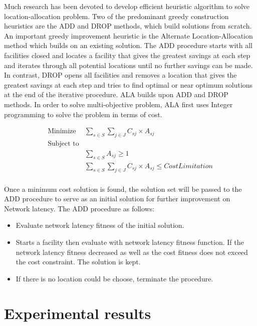 \documentclass{llncs}
\begin{document}
Much research has been devoted to develop efficient heuristic algorithm to solve location-allocation problem. Two of the predominant
greedy construction heuristics are the ADD and DROP \cite{Sun} methods, which build solutions from scratch. 
An important greedy improvement heuristic is the Alternate Location-Allocation method which builds on an existing solution. 
The ADD procedure starts with all facilities closed and locates a facility that gives the greatest savings at each step and 
iterates through all potential locations until no further savings can be made. In contrast, DROP opens all facilities and removes a 
location that gives the greatest savings at each step and tries to find optimal or near optimum solutions at the end of the 
iterative procedure. ALA builds upon ADD and DROP methods. In order to solve multi-objective problem, ALA first uses Integer programming
to solve the problem in terms of cost.
		

\begin{equation}
     \begin{align}
       \mbox{Minimize } & \sum\limits_{s \in S} \sum\limits_{j \in J} C_{sj} \times A_{sj} \\
       \mbox{Subject to} & \\
	        & \sum\limits_{s \in S} A_{sj} \geq 1 \\
	        & \sum\limits_{s \in S} \sum\limits_{j \in J} C_{sj} \times A_{sj} \leq CostLimitation \\
     \end{align}
\end{equation}

Once a minimum cost solution is found, the solution set will be passed to the ADD procedure to serve as an initial solution for 
further improvement on Network latency. The ADD procedure as follows:
\begin{itemize}
	\item Evaluate network latency fitness of the initial solution.
	\item Starts a facility then evaluate with network latency fitness function. If the network latency fitness decreased as well as 
		the cost fitness does not exceed the cost constraint. The solution is kept.
	\item If there is no location could be choose, terminate the procedure.
\end{itemize}


\section{Experimental results}
\end{document}
